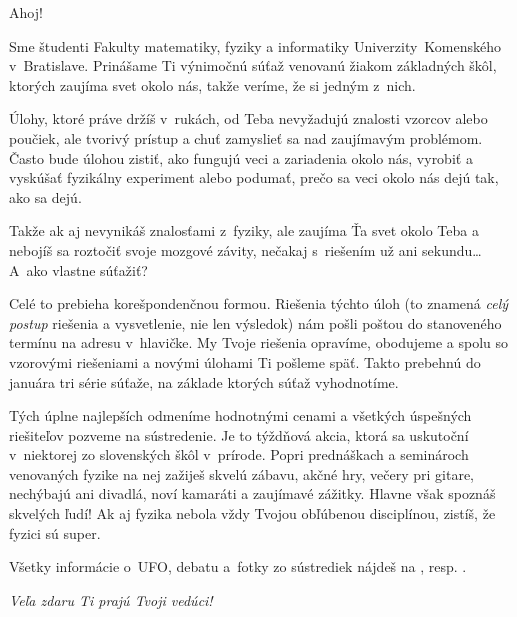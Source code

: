 Ahoj!

Sme študenti Fakulty matematiky, fyziky a informatiky
Univerzity~Komenského v~Bratislave. Prinášame Ti výnimočnú súťaž venovanú
žiakom základných škôl, ktorých zaujíma svet okolo nás, takže veríme,
že si jedným z~nich.

Úlohy, ktoré práve držíš v~rukách, od Teba nevyžadujú znalosti vzorcov
alebo poučiek, ale tvorivý prístup a chuť zamyslieť sa nad zaujímavým
problémom. Často bude úlohou zistiť, ako fungujú veci a zariadenia okolo
nás, vyrobiť a vyskúšať fyzikálny experiment alebo podumať, prečo sa veci
okolo nás dejú tak, ako sa dejú.

Takže ak aj nevynikáš znalosťami z~fyziky, ale zaujíma Ťa svet okolo
Teba a nebojíš sa roztočiť svoje mozgové závity, nečakaj s~riešením už
ani sekundu\dots A~ako vlastne súťažiť?

Celé to prebieha korešpondenčnou formou. Riešenia týchto úloh (to znamená
\emph{celý postup} riešenia a vysvetlenie, nie len výsledok) nám pošli
poštou do stanoveného termínu na adresu v~hlavičke. My Tvoje riešenia
opravíme, obodujeme a spolu so vzorovými riešeniami a novými úlohami Ti
pošleme späť. Takto prebehnú do januára tri série súťaže, na základe
ktorých súťaž vyhodnotíme.

Tých úplne najlepších odmeníme hodnotnými cenami a všetkých úspešných riešiteľov
pozveme na sústredenie. Je to týždňová akcia, ktorá sa uskutoční v~niektorej zo
slovenských škôl v~prírode. Popri prednáškach a seminároch venovaných fyzike na
nej zažiješ skvelú zábavu, akčné hry, večery pri gitare, nechýbajú ani divadlá,
noví kamaráti a zaujímavé zážitky. Hlavne však spoznáš skvelých ľudí! Ak aj
fyzika nebola vždy Tvojou obľúbenou disciplínou, zistíš, že fyzici sú super.

Všetky informácie o~UFO, debatu a~fotky zo sústrediek nájdeš na \URL{\seminarURL}, resp. .

\hfill \textit{Veľa zdaru Ti prajú Tvoji vedúci!}
